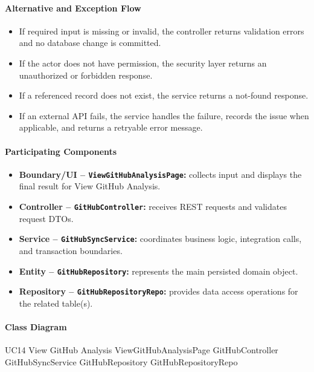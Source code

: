 \paragraph{Alternative and Exception Flow}

\begin{itemize}
    \item If required input is missing or invalid, the controller returns validation errors and no database change is committed.
    \item If the actor does not have permission, the security layer returns an unauthorized or forbidden response.
    \item If a referenced record does not exist, the service returns a not-found response.
    \item If an external API fails, the service handles the failure, records the issue when applicable, and returns a retryable error message.
\end{itemize}

\paragraph{Participating Components}

\begin{itemize}
    \item \textbf{Boundary/UI -- \texttt{ViewGitHubAnalysisPage}:} collects input and displays the final result for View GitHub Analysis.
    \item \textbf{Controller -- \texttt{GitHubController}:} receives REST requests and validates request DTOs.
    \item \textbf{Service -- \texttt{GitHubSyncService}:} coordinates business logic, integration calls, and transaction boundaries.
    \item \textbf{Entity -- \texttt{GitHubRepository}:} represents the main persisted domain object.
    \item \textbf{Repository -- \texttt{GitHubRepositoryRepo}:} provides data access operations for the related table(s).
\end{itemize}

\paragraph{Class Diagram}

\ClassDiagram
{UC14 View GitHub Analysis}
{ViewGitHubAnalysisPage}
{GitHubController}
{GitHubSyncService}
{GitHubRepository}
{GitHubRepositoryRepo}

